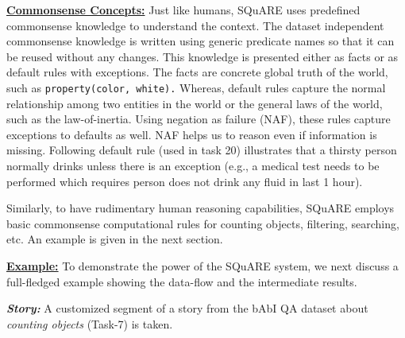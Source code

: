 \documentclass[letterpaper]{article}
\begin{document}
\medskip 
\noindent\textbf{\underline{Commonsense Concepts:}}
Just like humans, SQuARE uses predefined commonsense knowledge to understand the context. The dataset independent commonsense knowledge is written using generic predicate names so that it can be reused without any changes. This knowledge is presented either as facts or as default rules with exceptions. The facts are concrete global truth of the world, such as \texttt{property(color, white).} Whereas, default rules capture the normal relationship among two entities in the world or the general laws of the world, such as the law-of-inertia. Using negation as failure (NAF), these rules capture exceptions to defaults as well. NAF helps us to reason even if information is missing. Following default rule (used in task 20) illustrates that a thirsty person normally drinks unless there is an exception (e.g., a medical test needs to be performed which requires person does not drink any fluid in last 1 hour).

\smallskip 
\noindent    
\cprotect {}
    
\smallskip\noindent 
Similarly, to have rudimentary human reasoning capabilities, SQuARE employs basic commonsense computational rules for counting objects, filtering, searching, etc. An example is given in the next section.  

\noindent\textbf{\underline{Example:}}
To demonstrate the power of the SQuARE system, we next discuss a full-fledged example showing the data-flow and the intermediate results.

\noindent \textit{\textbf{Story:} } A customized segment of a story from the bAbI QA dataset about \textit{counting objects} (Task-7) is taken.

\smallskip 
\noindent
\cprotect {}
    
\end{document}
